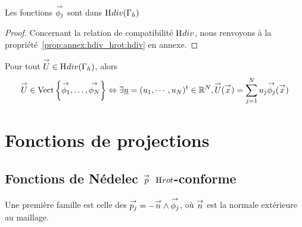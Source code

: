     \begin{prop}
      Les fonctions \(\phij\) sont dans \(\Hdiv(\Gamma_h)\)
    \end{prop}
    \begin{proof}
      Concernant la relation de compatibilité \(\Hdiv\), nous renvoyons à la propriété~\ref{prop:annex:hdiv_hrot:hdiv} en annexe.
    \end{proof}

    \begin{defn}
      Pour tout \(\vect{U} \in \Hdiv(\Gamma_h)\), alors
      \begin{equation*}
        \vect{U} \in \Vect{\vect{\phi_1},\ldots,\vect{\phi_N}} \Leftrightarrow \exists \comp{u} = (u_1,\cdots,u_N)^t \in \RR^N, \vect{U}(\vx) = \sum_{j=1}^N u_j \phij(\vx)
      \end{equation*}
    \end{defn}

\section{Fonctions de projections}


  \subsection[Fonctions de Nédélec p Hrot-conforme]{Fonctions de Nédelec \(\vect{p}\) \(\Hrot\)-conforme}

    Une première famille est celle des \(\pj=-\vn\pvect\phij\), où \(\vn\) est la normale extérieure au maillage. 

